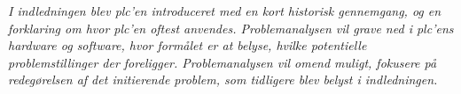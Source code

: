 \textit{I indledningen blev \gls{plc}'en introduceret med en kort historisk gennemgang, og en forklaring om hvor \gls{plc}'en oftest anvendes. Problemanalysen vil grave ned i \gls{plc}'ens hardware og software, hvor formålet er at belyse, hvilke potentielle problemstillinger der foreligger. Problemanalysen vil omend muligt, fokusere på redegørelsen af det initierende problem, som tidligere blev belyst i indledningen.}


